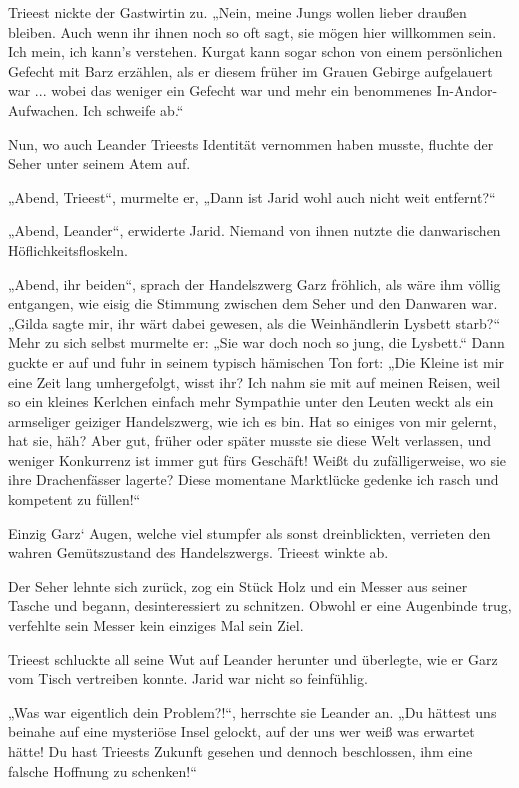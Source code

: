 Trieest nickte der Gastwirtin zu. „Nein, meine Jungs wollen lieber draußen bleiben. Auch wenn ihr ihnen noch so oft sagt, sie mögen hier willkommen sein. Ich mein, ich kann’s verstehen. Kurgat kann sogar schon von einem persönlichen Gefecht mit Barz erzählen, als er diesem früher im Grauen Gebirge aufgelauert war ... wobei das weniger ein Gefecht war und mehr ein benommenes In-Andor-Aufwachen. Ich schweife ab.“

Nun, wo auch Leander Trieests Identität vernommen haben musste, fluchte der Seher unter seinem Atem auf.

„Abend, Trieest“, murmelte er, „Dann ist Jarid wohl auch nicht weit entfernt?“

„Abend, Leander“, erwiderte Jarid. Niemand von ihnen nutzte die danwarischen Höflichkeitsfloskeln.

„Abend, ihr beiden“, sprach der Handelszwerg Garz fröhlich, als wäre ihm völlig entgangen, wie eisig die Stimmung zwischen dem Seher und den Danwaren war. „Gilda sagte mir, ihr wärt dabei gewesen, als die Weinhändlerin Lysbett starb?“ Mehr zu sich selbst murmelte er: „Sie war doch noch so jung, die Lysbett.“ Dann guckte er auf und fuhr in seinem typisch hämischen Ton fort: „Die Kleine ist mir eine Zeit lang umhergefolgt, wisst ihr? Ich nahm sie mit auf meinen Reisen, weil so ein kleines Kerlchen einfach mehr Sympathie unter den Leuten weckt als ein armseliger geiziger Handelszwerg, wie ich es bin. Hat so einiges von mir gelernt, hat sie, häh? Aber gut, früher oder später musste sie diese Welt verlassen, und weniger Konkurrenz ist immer gut fürs Geschäft! Weißt du zufälligerweise, wo sie ihre Drachenfässer lagerte? Diese momentane Marktlücke gedenke ich rasch und kompetent zu füllen!“

Einzig Garz‘ Augen, welche viel stumpfer als sonst dreinblickten, verrieten den wahren Gemütszustand des Handelszwergs. Trieest winkte ab.

Der Seher lehnte sich zurück, zog ein Stück Holz und ein Messer aus seiner Tasche und begann, desinteressiert zu schnitzen. Obwohl er eine Augenbinde trug, verfehlte sein Messer kein einziges Mal sein Ziel.

Trieest schluckte all seine Wut auf Leander herunter und überlegte, wie er Garz vom Tisch vertreiben konnte. Jarid war nicht so feinfühlig.

„Was war eigentlich dein Problem?!“, herrschte sie Leander an. „Du hättest uns beinahe auf eine mysteriöse Insel gelockt, auf der uns wer weiß was erwartet hätte! Du hast Trieests Zukunft gesehen und dennoch beschlossen, ihm eine falsche Hoffnung zu schenken!“

